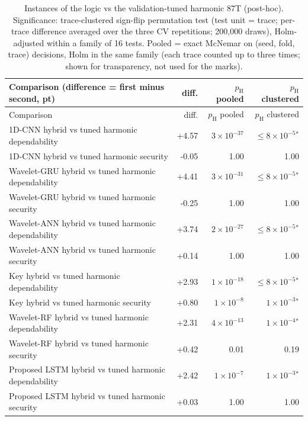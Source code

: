 \begin{longtable}{@{}p{8.6cm}rrr@{}}
\caption{Instances of the logic vs the validation-tuned harmonic 87T (post-hoc). Significance: trace-clustered sign-flip permutation test (test unit = trace; per-trace difference averaged over the three CV repetitions; 200{,}000 draws), Holm-adjusted within a family of 16 tests. Pooled = exact McNemar on (seed, fold, trace) decisions, Holm in the same family (each trace counted up to three times; shown for transparency, not used for the marks).}\label{tab:S5}\\
\toprule Comparison (difference = first minus second, pt) & diff. & $p_{\mathrm{H}}$ pooled & $p_{\mathrm{H}}$ clustered \\ \midrule \endfirsthead
\toprule Comparison & diff. & $p_{\mathrm{H}}$ pooled & $p_{\mathrm{H}}$ clustered \\ \midrule \endhead
1D-CNN hybrid vs tuned harmonic dependability & +4.57 & $3\times10^{-37}$ & $\le 8\times10^{-5}$$^{*}$ \\
1D-CNN hybrid vs tuned harmonic security & -0.05 & 1.00 & 1.00 \\
Wavelet-GRU hybrid vs tuned harmonic dependability & +4.41 & $3\times10^{-31}$ & $\le 8\times10^{-5}$$^{*}$ \\
Wavelet-GRU hybrid vs tuned harmonic security & -0.25 & 1.00 & 1.00 \\
Wavelet-ANN hybrid vs tuned harmonic dependability & +3.74 & $2\times10^{-27}$ & $\le 8\times10^{-5}$$^{*}$ \\
Wavelet-ANN hybrid vs tuned harmonic security & +0.14 & 1.00 & 1.00 \\
Key hybrid vs tuned harmonic dependability & +2.93 & $1\times10^{-18}$ & $\le 8\times10^{-5}$$^{*}$ \\
Key hybrid vs tuned harmonic security & +0.80 & $1\times10^{-8}$ & $1\times10^{-3}$$^{*}$ \\
Wavelet-RF hybrid vs tuned harmonic dependability & +2.31 & $4\times10^{-13}$ & $1\times10^{-4}$$^{*}$ \\
Wavelet-RF hybrid vs tuned harmonic security & +0.42 & 0.01 & 0.19 \\
Proposed LSTM hybrid vs tuned harmonic dependability & +2.42 & $1\times10^{-7}$ & $1\times10^{-3}$$^{*}$ \\
Proposed LSTM hybrid vs tuned harmonic security & +0.03 & 1.00 & 1.00 \\
\bottomrule
\end{longtable}
